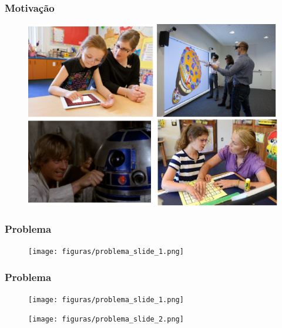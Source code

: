 \documentclass{beamer}
\begin{document}
\begin{frame}
\frametitle{Motivação}
\begin{figure}
\centering
\includegraphics[scale=0.39]{figuras/contexto_4.png}
\label{fig:problema1}
\end{figure}
\end{frame}


\begin{frame}
\frametitle{Problema}

\begin{figure}
\centering
\texttt{[image: figuras/problema\_slide\_1.png]}
\label{fig:problema1}
\end{figure}

\end{frame}



\begin{frame}
\frametitle{Problema}

\begin{figure}
\centering
\texttt{[image: figuras/problema\_slide\_1.png]}
\label{fig:problema1}
\end{figure}

\begin{figure}
\centering
\texttt{[image: figuras/problema\_slide\_2.png]}
\label{fig:arquitetura1}
\end{figure}



\end{frame}
\end{document}
